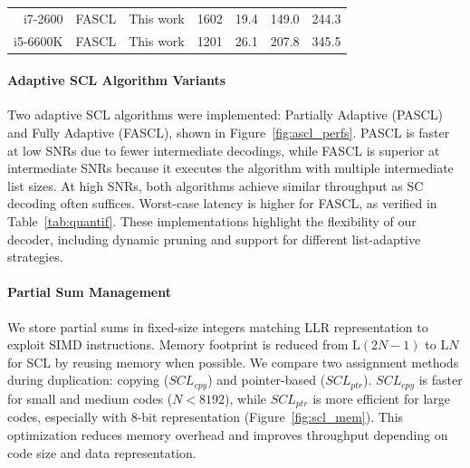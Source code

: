 \documentclass[11pt]{report}
\begin{document}
\begin{table}[hb!]
{{\begin{tabular}{r|l|c|c|c c c}
        \hline
        i7-2600                          & FASCL                                                                                     & This work                         & 1602                                              & 19.4                                            & 149.0           & 244.3           \\
        i5-6600K                         & FASCL                                                                                     & This work                         & 1201                                              & 26.1                                            & 207.8           & 345.5           \\
      \end{tabular}
    }}
  \parnotes
\end{table}
\paragraph{Adaptive SCL Algorithm Variants}
Two adaptive SCL algorithms were implemented: Partially Adaptive (PASCL) and Fully Adaptive (FASCL), shown in Figure~\ref{fig:ascl_perfs}. PASCL is faster at low SNRs due to fewer intermediate decodings, while FASCL is superior at intermediate SNRs because it executes the algorithm with multiple intermediate list sizes. At high SNRs, both algorithms achieve similar throughput as SC decoding often suffices. Worst-case latency is higher for FASCL, as verified in Table~\ref{tab:quantif}. These implementations highlight the flexibility of our decoder, including dynamic pruning and support for different list-adaptive strategies.


\paragraph{Partial Sum Management}
We store partial sums in fixed-size integers matching LLR representation to exploit SIMD instructions. Memory footprint is reduced from $\mathrm{L}(2N-1)$ to $\mathrm{L}N$ for SCL by reusing memory when possible. We compare two assignment methods during duplication: copying ($SCL_{cpy}$) and pointer-based ($SCL_{ptr}$). $SCL_{cpy}$ is faster for small and medium codes ($N<8192$), while $SCL_{ptr}$ is more efficient for large codes, especially with 8-bit representation (Figure~\ref{fig:scl_mem}). This optimization reduces memory overhead and improves throughput depending on code size and data representation.
\end{document}
